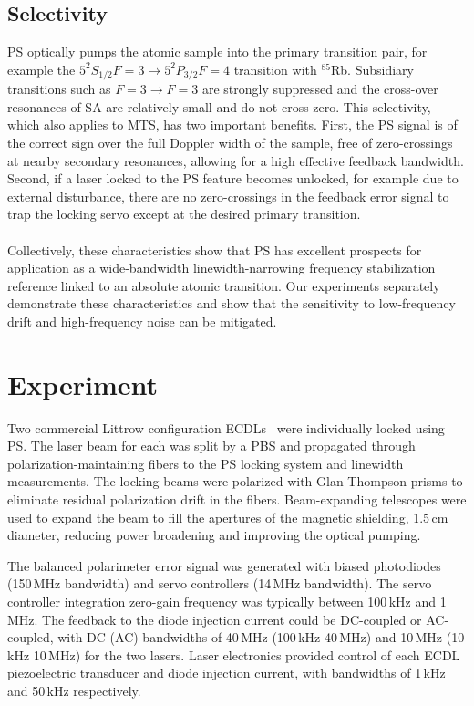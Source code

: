 \documentclass[10pt,letterpaper]{article}
\begin{document}
\subsection{Selectivity}
PS optically pumps the atomic sample into the primary transition pair, for example the $5^2S_{1/2} F=3\rightarrow5^2P_{3/2} F=4$ transition with $^{85}$Rb.
Subsidiary transitions such as $F=3\rightarrow F=3$ are strongly suppressed and the cross-over resonances of SA are relatively small and do not cross zero.
This selectivity, which also applies to MTS, has two important benefits.
First, the PS signal is of the correct sign over the full Doppler width of the sample, free of zero-crossings at nearby secondary resonances, allowing for a high effective feedback bandwidth.
Second, if a laser locked to the PS feature becomes unlocked, for example due to external disturbance, there are no zero-crossings in the feedback error signal to trap the locking servo except at the desired primary transition.
\\
\\
Collectively, these characteristics show that PS has excellent prospects for application as a wide-bandwidth linewidth-narrowing frequency stabilization reference linked to an absolute atomic transition.
Our experiments separately demonstrate these characteristics and show that the sensitivity to low-frequency drift and high-frequency noise can be mitigated.

\section{Experiment}
Two commercial Littrow configuration ECDLs~\cite{equipment} were individually locked using PS.
The laser beam for each was split by a PBS and propagated through polarization-maintaining fibers to the PS locking system and linewidth measurements.
The locking beams were polarized with Glan-Thompson prisms to eliminate residual polarization drift in the fibers.
Beam-expanding telescopes were used to expand the beam to fill the apertures of the magnetic shielding, 1.5\,cm diameter, reducing power broadening and improving the optical pumping.

The balanced polarimeter error signal was generated with biased photodiodes (150\,MHz bandwidth) and servo controllers (14\,MHz bandwidth).
The servo controller integration zero-gain frequency was typically between 100\,kHz and 1\,MHz.
The feedback to the diode injection current could be DC-coupled or AC-coupled, with DC (AC) bandwidths of 40\,MHz (100\,kHz\,\textendash\,40\,MHz) and 10\,MHz (10\,kHz\,\textendash\,10\,MHz) for the two lasers.
Laser electronics provided control of each ECDL piezoelectric transducer and diode injection current, with bandwidths of 1\,kHz and 50\,kHz respectively.
\end{document}
